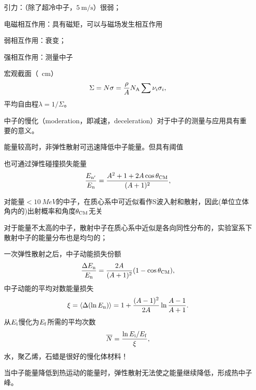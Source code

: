 \begin{compactitem}
	\item 引力：（除了超冷中子，$\qty{5}{\metre\per\second}$）很弱；
	\item 电磁相互作用：具有磁矩，可以与磁场发生相互作用
	\item 弱相互作用：衰变；
	\item 强相互作用：测量中子
\end{compactitem}
宏观截面（\unit{\per\centi\metre}）
\begin{equation}\label{eq:nrd-macroscopic-cross-section}
	\Sigma = N\sigma = \frac\rho{A}N_{\mathrm{A}}\sum\nu_i\sigma_i,
\end{equation}
平均自由程$\lambda = 1/\Sigma$。

中子的慢化（moderation，即减速，deceleration）对于中子的测量与应用具有重要的意义。
\begin{compactitem}
	\item 能量较高时，非弹性散射可迅速降低中子能量。但具有阈值
	\item 也可通过弹性碰撞损失能量
	\begin{equation}\label{eq:nrd-neutron-elastic-energy-ratio}
		\frac{E_{\mathrm n'}}{E_\mathrm n} = \frac{A^2 + 1 + 2A\cos\theta_{\mathrm{CM}}}{(A + 1)^2},
	\end{equation}
\end{compactitem}
对能量$< \qty{10}{MeV}$的中子，在质心系中可近似看作S波入射和散射，因此(单位立体角内的)出射概率和角度$\theta_{\mathrm{CM}}$无关

对于能量不太高的中子，散射中子在质心系中近似是各向同性分布的，实验室系下散射中子的能量分布也是均匀的；

一次弹性散射之后，中子动能损失份额
\begin{equation}\label{eq:nrd-neutron-fractional-energy-loss}
	\frac{\Delta E_\mathrm n}{E_\mathrm n} = \frac{2A}{(A + 1)^2}(1 - \cos\theta_{\mathrm{CM}}),
\end{equation}
中子动能的平均对数能量损失
\begin{equation}\label{eq:nrd-logarithmic-energy-decrement}
	\xi = \langle\Delta(\ln E_\mathrm n)\rangle = 1 + \frac{(A - 1)^2}{2A}\ln\frac{A - 1}{A + 1}.
\end{equation}
从$E_\mathrm i$慢化为$E_\mathrm f$所需的平均次数
\begin{equation}\label{eq:nrd-mean-slowing-collisions}
	\overline{N} = \frac{\ln E_\mathrm i/E_\mathrm f}{\xi},
\end{equation}
水，聚乙烯，石蜡是很好的慢化体材料！

当中子能量降低到热运动的能量时，弹性散射无法使之能量继续降低，形成热中子峰。

